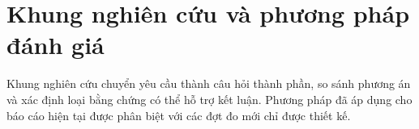 \chapter{Khung nghiên cứu và phương pháp đánh giá}\label{chap:methods}
Khung nghiên cứu chuyển yêu cầu thành câu hỏi thành phần, so sánh phương án và xác định loại bằng chứng có thể hỗ trợ kết luận. Phương pháp đã áp dụng cho báo cáo hiện tại được phân biệt với các đợt đo mới chỉ được thiết kế.



